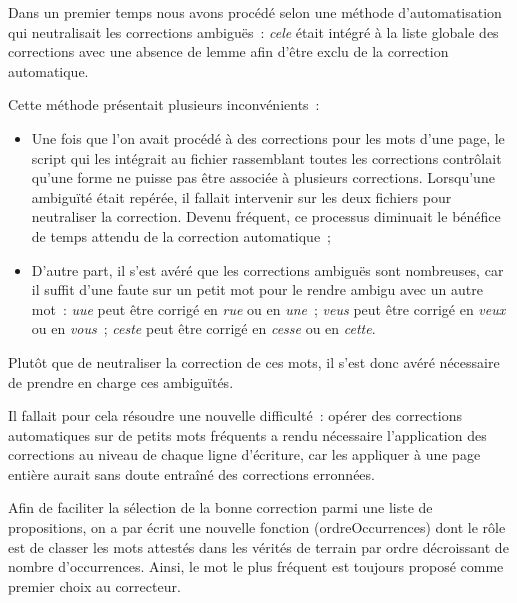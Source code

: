\documentclass[a4paper,12pt,twoside]{book}
\begin{document}
				Dans un premier temps nous avons procédé selon une méthode d'automatisation qui neutralisait les corrections ambiguës~: \textit{cele} était intégré à la liste globale des corrections avec une absence de lemme afin d'être exclu de la correction automatique.
				
				Cette méthode présentait plusieurs inconvénients~:

				\begin{itemize}
					\item Une fois que l'on avait procédé à des corrections pour les mots d'une page, le script qui les intégrait au fichier rassemblant toutes les corrections contrôlait qu'une forme ne puisse pas être associée à plusieurs corrections. Lorsqu'une ambiguïté était repérée, il fallait intervenir sur les deux fichiers pour neutraliser la correction. Devenu fréquent, ce processus diminuait le bénéfice de temps attendu de la correction automatique~;

					\item D'autre part, il s'est avéré que les corrections ambiguës sont nombreuses, car il suffit d'une faute sur un petit mot pour le rendre ambigu avec un autre mot~: \textit{uue} peut être corrigé en \textit{rue} ou en \textit{une}~; \textit{veus} peut être corrigé en \textit{veux} ou en \textit{vous}~; \textit{ceste} peut être corrigé en \textit{cesse} ou en \textit{cette}.
				
				\end{itemize}
				
				Plutôt que de neutraliser la correction de ces mots, il s'est donc avéré nécessaire de prendre en charge ces ambiguïtés.
				
				Il fallait pour cela résoudre une nouvelle difficulté~: opérer des corrections automatiques sur de petits mots fréquents a rendu nécessaire l'application des corrections au niveau de chaque ligne d'écriture, car les appliquer à une page entière aurait sans doute entraîné des corrections erronnées.
						
				Afin de faciliter la sélection de la bonne correction parmi une liste de propositions, on a par écrit une nouvelle fonction (\textsf{ordreOccurrences}) dont le rôle est de classer les mots attestés dans les vérités de terrain par ordre décroissant de nombre d'occurrences. Ainsi, le mot le plus fréquent est toujours proposé comme premier choix au correcteur.
			
	\appendix
	
	\renewcommand{\appendixpagename}{Annexes}
	
\end{document}
